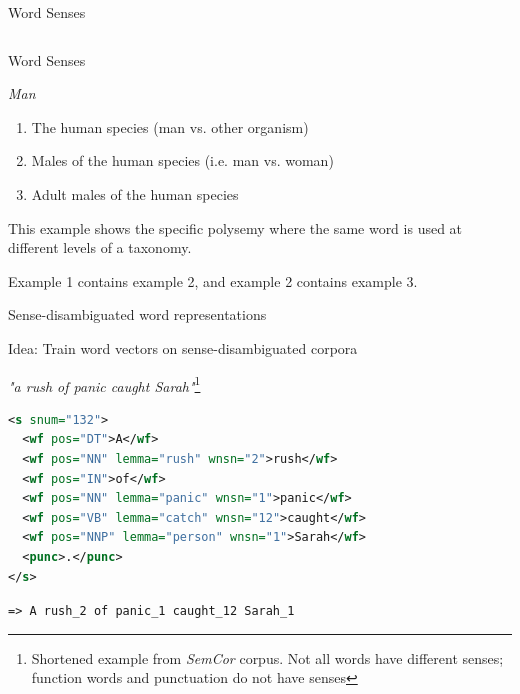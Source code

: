 \documentclass[12pt]{beamer}
\begin{document}
\begin{frame}{Word Senses}
\begin{columns}
\begin{column}{4cm}
\end{column}
	
\end{columns}	


	

	
	
	

	
	
\end{frame}


\begin{frame}{Word Senses}

\emph{Man}

\begin{enumerate}
	\item The human species (man vs. other organism)
	\item Males of the human species (i.e. man vs. woman)
	\item Adult males of the human species
\end{enumerate}


This example shows the specific polysemy where the same word is used at different levels of a taxonomy.

Example 1 contains example 2, and example 2 contains example 3.
	
	
\end{frame}

\begin{frame}[fragile]{Sense-disambiguated word representations}
	

Idea: Train word vectors on sense-disambiguated corpora

\emph{"a rush of panic caught Sarah"}\footnote{Shortened example from \emph{SemCor} corpus. Not all words have different senses; function words and punctuation do not have senses}


\begin{lstlisting}[language=XML]
<s snum="132">
  <wf pos="DT">A</wf>
  <wf pos="NN" lemma="rush" wnsn="2">rush</wf>
  <wf pos="IN">of</wf>
  <wf pos="NN" lemma="panic" wnsn="1">panic</wf>
  <wf pos="VB" lemma="catch" wnsn="12">caught</wf>
  <wf pos="NNP" lemma="person" wnsn="1">Sarah</wf>
  <punc>.</punc>
</s>
\end{lstlisting}

\vspace*{-3em}
\texttt{=> A rush\_2 of panic\_1 caught\_12 Sarah\_1}


\end{frame}
\end{document}
